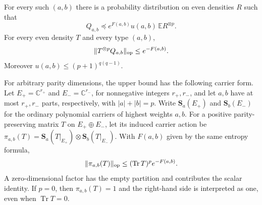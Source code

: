 \begin{lemma}
\label{lem:signed-type-density}
For every such $(a,b)$ there is a probability distribution on even
densities $R$ such that
\begin{equation}
 Q_{a,b}\preceq e^{F(a,b)}u(a,b)\,\mathbb E R^{\otimes p}.
 \label{eq:signed-type-density-exact}
\end{equation}
For every even density $T$ and every type $(a,b)$,
\begin{equation}
 \|T^{\otimes p}Q_{a,b}\|_{\rm op}\le e^{-F(a,b)}.
 \label{eq:signed-global-density-upper}
\end{equation}
Moreover $u(a,b)\le(p+1)^{q(q-1)}$.

For arbitrary parity dimensions, the upper bound has the following
carrier form. Let
$E_+=\mathbb C^{r_+}$ and $E_-=\mathbb C^{r_-}$, for nonnegative integers
$r_+,r_-$, and let $a,b$ have at most $r_+,r_-$ parts,
respectively, with $|a|+|b|=p$. Write $\mathbf S_a(E_+)$ and
$\mathbf S_b(E_-)$ for the ordinary polynomial carriers of highest
weights $a,b$. For a positive parity-preserving matrix $T$ on
$E_+\oplus E_-$, let its induced carrier action be
$\pi_{a,b}(T)=\mathbf S_a(T|_{E_+})\otimes\mathbf S_b(T|_{E_-})$.
With $F(a,b)$ given by the same entropy formula,
\begin{equation}
 \|\pi_{a,b}(T)\|_{\rm op}
 \le (\operatorname{Tr}T)^p e^{-F(a,b)}.
 \label{eq:signed-carrier-density-upper}
\end{equation}
A zero-dimensional factor has the empty partition and contributes
the scalar identity. If $p=0$, then $\pi_{a,b}(T)=1$ and the
right-hand side is interpreted as one, even when $\operatorname{Tr}T=0$.
\end{lemma}
